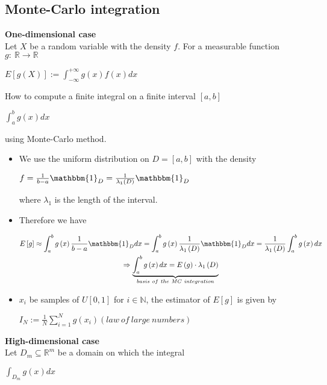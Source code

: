 \documentclass{article}
\begin{document}
\subsection{Monte-Carlo integration}
\textbf{One-dimensional case}\\
Let $X$ be a random variable with the density $f$. For a measurable function $g:\  \mathbb{R} \rightarrow \mathbb{R}$
\begin{center}
	$E\left[ g\left( X\right)  \right]  :=\int^{+\infty }_{-\infty } g\left( x\right)  f\left( x\right)  dx$
\end{center}
How to compute a finite integral on a finite interval $\left[ a, b\right]$
\begin{center}
	$\int^{b}_{a} g\left( x\right)  dx$
\end{center}
using Monte-Carlo method.
\begin{itemize}
	\item We use the uniform distribution on $D=\left[ a, b\right]$ with the density\begin{center}
		$f=\frac{1}{b-a} \mathbbm{1}_{D} =\frac{1}{\lambda_{1} \left( D\right)  } \mathbbm{1}_{D}$
	\end{center}
	where $\lambda_{1}$ is the length of the interval.
	\item Therefore we have\begin{center}
		$\begin{gathered}E\left[ g\right]  \approx \int^{b}_{a} g\left( x\right)  \frac{1}{b-a} \mathbbm{1}_{D} dx=\int^{b}_{a} g\left( x\right)  \frac{1}{\lambda_{1} \left( D\right)  } \mathbbm{1}_{D} dx=\frac{1}{\lambda_{1} \left( D\right)  } \int^{b}_{a} g\left( x\right)  dx\\ \Rightarrow \underbrace{\int^{b}_{a} g\left( x\right)  dx=E\left( g\right)  \cdot \lambda_{1} \left( D\right)  }_{basis\  of\  the\  MC\  integration} \end{gathered} $
	\end{center}
	\item $x_{i}$ be samples of $U\left[ 0,1\right]$ for $i\in \mathbb{N}$, the estimator of $E\left[ g\right]$ is given by\begin{center}
		$I_{N}:=\frac{1}{N} \sum^{N}_{i=1} g\left( x_{i}\right)  \left( law\  of\  large\  numbers\right)$
	\end{center}
\end{itemize}
\textbf{High-dimensional case}\\
Let $D_{m}\subseteq \mathbb{R}^{m}$ be a domain on which the integral
\begin{center}
	$\int^{}_{D_{m}} g\left( x\right)  dx$
\end{center}
\end{document}

